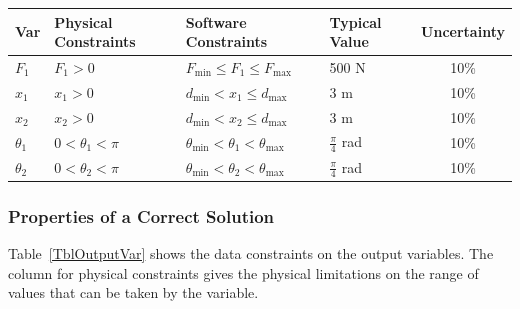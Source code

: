 \documentclass[12pt]{article}
\begin{document}
\begin{table}[!h]
  \caption{Input Data Constraints} \label{TblInputCon}
  \renewcommand{\arraystretch}{1.2}
\noindent 
\begin{longtable*}{l l l l c} 
  \toprule
  \textbf{Var} & \textbf{Physical Constraints} & \textbf{Software Constraints} &
                             \textbf{Typical Value} & \textbf{Uncertainty}\\
  \midrule 
  $F_{\text{1}}$ & $F_{\text{1}} > 0$ & $F_{\text{min}} \leq F_{\text{1}} \leq 
  F_{\text{max}}$ & 500 \si{\newton} & 10\%  \\
  $x_{\text{1}}$ & $x_{\text{1}} > 0$ & $d_{\text{min}} < x_{\text{1}} \leq 
  d_{\text{max}}$ & 3 \si{\metre} & 10\%  \\
  $x_{\text{2}}$ & $x_{\text{2}} > 0$ & $d_{\text{min}} < x_{\text{2}} \leq 
  d_{\text{max}}$ & 3 \si{\metre} & 10\%  \\
  $\theta_{\text{1}}$ & $0 < \theta_{\text{1}} < \pi $ & $ \theta_{\text{min}} 
  < \theta_{\text{1}} < \theta_{\text{max}}$ & $\frac{\pi}{4}$ \si{\radian} & 
  10\%  \\
  $\theta_{\text{2}}$ & $0 < \theta_{\text{2}} < \pi $ & $\theta_{\text{min}} < 
  \theta_{\text{2}} < \theta_{\text{max}}$ & $\frac{\pi}{4}$ \si{\radian} & 
  10\%  \\
  \bottomrule
 
\end{longtable*}
\end{table}

\noindent 



\subsubsection{Properties of a Correct Solution} \label{sec_CorrectSolution}

\noindent
Table~\ref{TblOutputVar} shows the data constraints on the output variables. 
The column for physical constraints gives the physical limitations on the range 
of values that can be taken by the variable.
\end{document}

